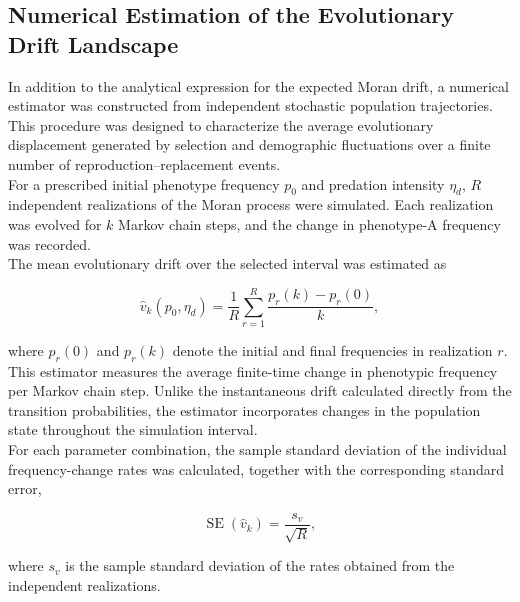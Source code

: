 \subsection{Numerical Estimation of the Evolutionary Drift Landscape}
\label{sec:stochastic_drift_methodology}

In addition to the analytical expression for the expected Moran drift, a numerical estimator was constructed from independent stochastic population trajectories. This procedure was designed to characterize the average evolutionary displacement generated by selection and demographic fluctuations over a finite number of reproduction--replacement events. \\ 

For a prescribed initial phenotype frequency \(p_0\) and predation intensity \(\eta_d\), \(R\) independent realizations of the Moran process were simulated. Each realization was evolved for \(k\) Markov chain steps, and the change in phenotype-A frequency was recorded. \\ 

The mean evolutionary drift over the selected interval was estimated as

\begin{equation}
\widehat{v}_k(p_0,\eta_d)
=
\frac{1}{R}
\sum_{r=1}^{R}
\frac{p_r(k)-p_r(0)}{k},
\label{eq:method_empirical_drift}
\end{equation}

where \(p_r(0)\) and \(p_r(k)\) denote the initial and final frequencies in realization \(r\). \\ 

This estimator measures the average finite-time change in phenotypic frequency per Markov chain step. Unlike the instantaneous drift calculated directly from the transition probabilities, the estimator incorporates changes in the population state throughout the simulation interval.\\ 

For each parameter combination, the sample standard deviation of the individual frequency-change rates was calculated, together with the corresponding standard error,

\begin{equation}
\operatorname{SE}(\widehat v_k)
=
\frac{s_v}{\sqrt{R}},
\label{eq:method_drift_error}
\end{equation}

where \(s_v\) is the sample standard deviation of the rates obtained from the independent realizations. \\ 

